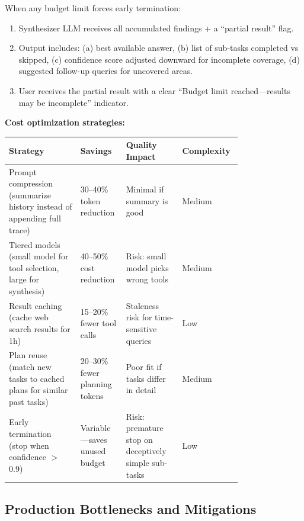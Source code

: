 When any budget limit forces early termination:
\begin{enumerate}
  \item Synthesizer LLM receives all accumulated findings + a ``partial result'' flag.
  \item Output includes: (a) best available answer, (b) list of sub-tasks completed vs skipped, (c) confidence score adjusted downward for incomplete coverage, (d) suggested follow-up queries for uncovered areas.
  \item User receives the partial result with a clear ``Budget limit reached---results may be incomplete'' indicator.
\end{enumerate}

\textbf{Cost optimization strategies:}

\begin{tabular}{|p{0.28\linewidth}|p{0.14\linewidth}|p{0.22\linewidth}|p{0.14\linewidth}|}
\hline
\textbf{Strategy} & \textbf{Savings} & \textbf{Quality Impact} & \textbf{Complexity} \\
\hline
Prompt compression (summarize history instead of appending full trace) & 30--40\% token reduction & Minimal if summary is good & Medium \\
\hline
Tiered models (small model for tool selection, large for synthesis) & 40--50\% cost reduction & Risk: small model picks wrong tools & Medium \\
\hline
Result caching (cache web search results for 1h) & 15--20\% fewer tool calls & Staleness risk for time-sensitive queries & Low \\
\hline
Plan reuse (match new tasks to cached plans for similar past tasks) & 20--30\% fewer planning tokens & Poor fit if tasks differ in detail & Medium \\
\hline
Early termination (stop when confidence $>$ 0.9) & Variable---saves unused budget & Risk: premature stop on deceptively simple sub-tasks & Low \\
\hline
\end{tabular}

\subsection*{Production Bottlenecks and Mitigations}

